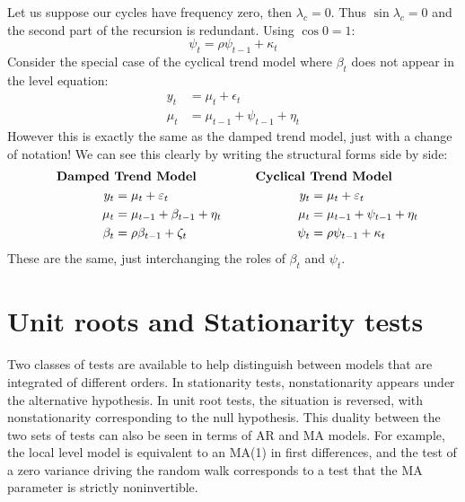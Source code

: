\documentclass[DIV=14,titlepage=false]{scrreprt}
\begin{document}
\begin{solution}
    Let us suppose our cycles have frequency zero, then $\lambda_c=0$. Thus $\sin \lambda_c=0$ and the second part of the recursion is redundant. Using $\cos 0 = 1$:
    \[
        \psi_t = \rho \psi_{t-1} + \kappa_t
    \]
    Consider the special case of the cyclical trend model where $\beta_t$ does not appear in the level equation:
    \begin{align*}
        y_t &= \mu_t + \epsilon_t\\
        \mu_t &= \mu_{t-1} + \psi_{t-1} + \eta_t
    \end{align*}
    However this is exactly the same as the damped trend model, just with a change of notation! We can see this clearly by writing the structural forms side by side:
    \begin{align*}
        \text{ \textbf{ Damped }}&\text{\textbf{Trend Model}}  & \quad \text{ \textbf{ Cyclical }}&\text{\textbf{Trend Model}}\\
        y_t &= \mu_t + \epsilon_t & y_t &= \mu_t + \epsilon_t\\
        \mu_t &= \mu_{t-1} + \beta_{t-1} + \eta_t & \mu_t &= \mu_{t-1} + \psi_{t-1} + \eta_t\\
        \beta_t &= \rho \beta_{t-1} + \zeta_t & \psi_t &= \rho \psi_{t-1} + \kappa_t
    \end{align*}
    These are the same, just interchanging the roles of $\beta_t$ and $\psi_t$.
\end{solution}
\section{Unit roots and Stationarity tests}
Two classes of tests are available to help distinguish between models that are integrated of different orders. In stationarity tests, nonstationarity appears under the alternative hypothesis. In unit root tests, the situation is reversed, with nonstationarity corresponding to the null hypothesis. This duality between the two sets of tests can also be seen in terms of AR and MA models. For example, the local level model is equivalent to an MA(1) in first differences, and the test of a zero variance driving the random walk corresponds to a test that the MA parameter is strictly noninvertible.
\end{document}
